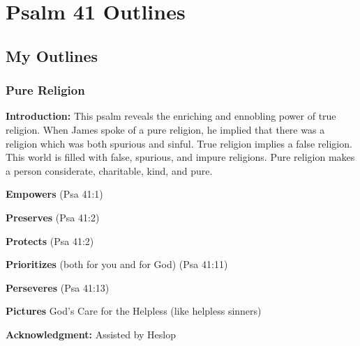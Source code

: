 \section{Psalm 41 Outlines}

\subsection{My Outlines}

\subsubsection{Pure Religion}
\textbf{Introduction: } This psalm reveals the enriching and ennobling power of true religion. When James spoke of a pure religion, he implied that there was a religion which was both spurious and sinful. True religion implies a false religion. This world is filled with false, spurious, and impure religions. Pure religion makes a person considerate, charitable, kind, and pure.
\begin{compactenum}[I.]
    \item \textbf{Empowers}  (Psa  41:1)
    \item \textbf{Preserves}  (Psa  41:2)
    \item \textbf{Protects}  (Psa  41:2)
    \item \textbf{Prioritizes} (both for you and for God)  (Psa  41:11)
    \item \textbf{Perseveres}  (Psa  41:13)
    \item \textbf{Pictures} God's Care for the Helpless (like helpless sinners) %
\end{compactenum}
\textbf{Acknowledgment: } Assisted by Heslop
